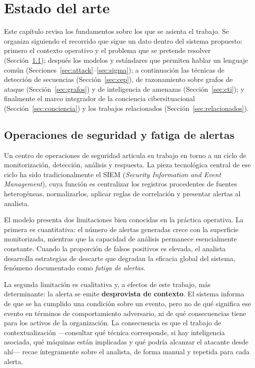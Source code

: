 \chapter{Estado del arte}
\label{cap:estadoarte}

Este capítulo revisa los fundamentos sobre los que se asienta el trabajo. Se organiza
siguiendo el recorrido que sigue un dato dentro del sistema propuesto: primero el contexto
operativo y el problema que se pretende resolver (Sección~\ref{sec:soc}); después los
modelos y estándares que permiten hablar un lenguaje común
(Secciones~\ref{sec:attack}--\ref{sec:sigma}); a continuación las técnicas de detección de
secuencias (Sección~\ref{sec:cep}), de razonamiento sobre grafos de ataque
(Sección~\ref{sec:grafos}) y de inteligencia de amenazas (Sección~\ref{sec:cti}); y
finalmente el marco integrador de la conciencia cibersituacional
(Sección~\ref{sec:conciencia}) y los trabajos relacionados
(Sección~\ref{sec:relacionados}).

\section{Operaciones de seguridad y fatiga de alertas}
\label{sec:soc}

Un centro de operaciones de seguridad articula su trabajo en torno a un ciclo de
monitorización, detección, análisis y respuesta. La pieza tecnológica central de ese ciclo
ha sido tradicionalmente el SIEM (\textit{Security Information and Event Management}), cuya
función es centralizar los registros procedentes de fuentes heterogéneas, normalizarlos,
aplicar reglas de correlación y presentar alertas al analista.

El modelo presenta dos limitaciones bien conocidas en la práctica operativa. La primera es
cuantitativa: el número de alertas generadas crece con la superficie monitorizada, mientras
que la capacidad de análisis permanece esencialmente constante. Cuando la proporción de
falsos positivos es elevada, el analista desarrolla estrategias de descarte que degradan la
eficacia global del sistema, fenómeno documentado como \textit{fatiga de alertas}.

La segunda limitación es cualitativa y, a efectos de este trabajo, más determinante: la
alerta se emite \textbf{desprovista de contexto}. El sistema informa de que se ha cumplido
una condición sobre un evento, pero no de qué significa ese evento en términos de
comportamiento adversario, ni de qué consecuencias tiene para los activos de la
organización. La consecuencia es que el trabajo de contextualización —consultar qué técnica
corresponde, si hay inteligencia asociada, qué máquinas están implicadas y qué podría
alcanzar el atacante desde ahí— recae íntegramente sobre el analista, de forma manual y
repetida para cada alerta.


